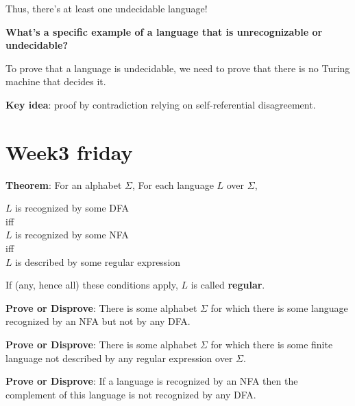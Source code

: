 \documentclass[12pt, oneside]{article}
\begin{document}
Thus, there's at least one undecidable language!

\vfill

{\bf What's a specific example of a language that is unrecognizable or undecidable?}

To prove that a language is undecidable, we need to prove that there is no Turing machine that decides it.

{\bf Key idea}: proof by contradiction relying on self-referential disagreement.

 \vfill
\section*{Week3 friday}



{\bf Theorem}: For an alphabet $\Sigma$, For each language $L$ over $\Sigma$, 
\begin{center}
$L$ is recognized by some DFA \\
iff\\
$L$ is recognized by some NFA\\
iff\\
$L$ is described by some regular expression
\end{center}
If (any, hence all) these conditions apply, $L$ is called {\bf regular}.



{\bf Prove or Disprove}: There is some alphabet $\Sigma$ for which there is 
some language recognized by an NFA but not by any DFA.

\vspace{30pt}

{\bf Prove or Disprove}: There is some alphabet $\Sigma$ for which there is 
some finite language not described by any regular expression over $\Sigma$.

\vspace{30pt}


{\bf Prove or Disprove}: If a language is recognized by an NFA 
then the complement of this language is not recognized by any DFA.

\vspace{30pt}
\end{document}
